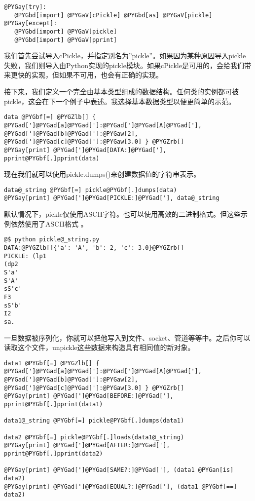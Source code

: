 \documentclass[letterpaper,10pt,english]{manual}
\begin{document}
\begin{Verbatim}[commandchars=@\[\]]
@PYGay[try]:
   @PYGbd[import] @PYGaV[cPickle] @PYGbd[as] @PYGaV[pickle]
@PYGay[except]:
   @PYGbd[import] @PYGaV[pickle]
   @PYGbd[import] @PYGaV[pprint]
\end{Verbatim}

我们首先尝试导入cPickle，并指定别名为''pickle''。如果因为某种原因导入pickle失败，我们则导入由Python实现的pickle模块。如果cPickle是可用的，会给我们带来更快的实现，但如果不可用，也会有正确的实现。

接下来，我们定义一个完全由基本类型组成的数据结构。任何类的实例都可被pickle，这会在下一个例子中表述。我选择基本数据类型以便更简单的示范。

\begin{Verbatim}[commandchars=@\[\]]
data @PYGbf[=] @PYGZlb[] { @PYGad[']@PYGad[a]@PYGad[']:@PYGad[']@PYGad[A]@PYGad['], @PYGad[']@PYGad[b]@PYGad[']:@PYGaw[2], @PYGad[']@PYGad[c]@PYGad[']:@PYGaw[3.0] } @PYGZrb[]
@PYGay[print] @PYGad[']@PYGad[DATA:]@PYGad['],
pprint@PYGbf[.]pprint(data)
\end{Verbatim}

现在我们就可以使用pickle.dumps()来创建数据值的字符串表示。

\begin{Verbatim}[commandchars=@\[\]]
data@_string @PYGbf[=] pickle@PYGbf[.]dumps(data)
@PYGay[print] @PYGad[']@PYGad[PICKLE:]@PYGad['], data@_string
\end{Verbatim}

默认情况下，pickle仅使用ASCII字符。也可以使用高效的二进制格式。但这些示例依然使用了ASCII格式 。

\begin{Verbatim}[commandchars=@\[\]]
@$ python pickle@_string.py
DATA:@PYGZlb[]{'a': 'A', 'b': 2, 'c': 3.0}@PYGZrb[]
PICKLE: (lp1
(dp2
S'a'
S'A'
sS'c'
F3
sS'b'
I2
sa.
\end{Verbatim}

一旦数据被序列化，你就可以把他写入到文件、socket、管道等等中。之后你可以读取这个文件，unpickle这些数据来构造具有相同值的新对象。

\begin{Verbatim}[commandchars=@\[\]]
data1 @PYGbf[=] @PYGZlb[] { @PYGad[']@PYGad[a]@PYGad[']:@PYGad[']@PYGad[A]@PYGad['], @PYGad[']@PYGad[b]@PYGad[']:@PYGaw[2], @PYGad[']@PYGad[c]@PYGad[']:@PYGaw[3.0] } @PYGZrb[]
@PYGay[print] @PYGad[']@PYGad[BEFORE:]@PYGad['],
pprint@PYGbf[.]pprint(data1)

data1@_string @PYGbf[=] pickle@PYGbf[.]dumps(data1)

data2 @PYGbf[=] pickle@PYGbf[.]loads(data1@_string)
@PYGay[print] @PYGad[']@PYGad[AFTER:]@PYGad['],
pprint@PYGbf[.]pprint(data2)

@PYGay[print] @PYGad[']@PYGad[SAME?:]@PYGad['], (data1 @PYGan[is] data2)
@PYGay[print] @PYGad[']@PYGad[EQUAL?:]@PYGad['], (data1 @PYGbf[==] data2)
\end{Verbatim}
\end{document}
